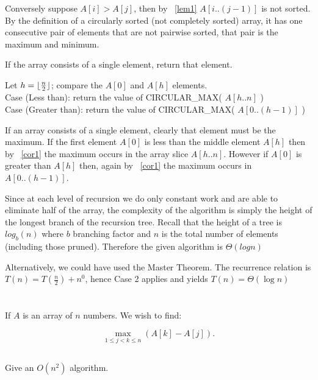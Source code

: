 \documentclass{amsart}
\theoremstyle{definition}
\theoremstyle{remark}
\numberwithin{equation}{section}
\DeclarePairedDelimiter{\floor}{\lfloor}{\rfloor}
\begin{document}
Conversely suppose $A[i] > A[j]$, then by ~\ref{lem1} $A[i..(j-1)]$ is
not sorted. By the definition of a circularly sorted (not completely
sorted) array, it has one consecutive pair of elements that are not
pairwise sorted, that pair is the maximum and minimum.


If the array consists of a single element, return that element.

Let $h = \floor{ \frac{n}{2} }$; compare the $A[0]$ and $A[h]$ elements. \\

Case (Less than): return the value of CIRCULAR\_MAX( $A[h..n]$ ) \\

Case (Greater than): return the value of CIRCULAR\_MAX( $A[0..(h-1)]$ ) \\

\proof

If an array consists of a single element, clearly that element must
be the maximum. If the first element $A[0]$ is less than the middle
element $A[h]$ then by ~\ref{cor1} the maximum occurs in the array slice
$A[h..n]$. However if $A[0]$ is greater than $A[h]$ then, again by
~\ref{cor1} the maximum occurs in $A[0..(h-1)]$.


\proof

Since at each level of recursion we do only constant work and are able
to eliminate half of the array, the complexity of the algorithm is
simply the height of the longest branch of the recursion tree. Recall
that the height of a tree is $log_{b} (n)$ where $b$ branching factor
and $n$ is the total number of elements (including those pruned).
Therefore the given algorithm is $\Theta( log n )$

Alternatively, we could have used the Master Theorem. The recurrence
relation is $T(n) = T(\frac{n}{2}) + n^0$, hence Case 2 applies and
yields $T(n) = \Theta (\log n)$
\\


\section{}

If $A$ is an array of $n$ numbers. We wish to find:

$$ \max_{1 \leq j<k \leq n} (A[k] - A[j]).$$

\subsection{} Give an $O( n^2 )$ algorithm.
\end{document}
